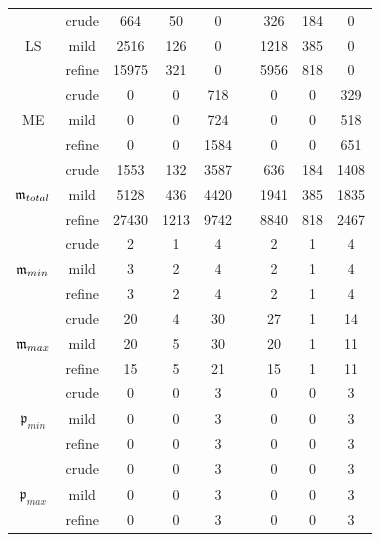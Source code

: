 \begin{table}[htb]
\begin{adjustbox}{width=0.8\columnwidth,center}
\begin{tabular}{  ccccccccc }
    \hline
    & crude & 664 & 50 & 0 &  & 326 & 184 & 0 \\
    LS & mild & 2516 & 126 & 0 &  & 1218 & 385 & 0 \\
    & refine & 15975 & 321 & 0 &  & 5956 & 818 & 0 \\
    \hline
    & crude & 0 & 0 & 718 &  & 0 & 0 & 329 \\
    ME & mild & 0 & 0 & 724 &  & 0 & 0 & 518 \\
    & refine & 0 & 0 & 1584 &  & 0 & 0 & 651 \\
    \hline
    & crude & 1553 & 132 & 3587 &  & 636 & 184 & 1408 \\
    $\mathfrak{m}_{total}$ & mild & 5128 & 436 & 4420 &  & 1941 & 385 & 1835 \\
    & refine & 27430 & 1213 & 9742 &  & 8840 & 818 & 2467 \\
    \hline
    & crude & 2 & 1 & 4 &  & 2 & 1 & 4 \\
    $\mathfrak{m}_{min}$ & mild & 3 & 2 & 4 &  & 2 & 1 & 4 \\
    & refine & 3 & 2 & 4 &  & 2 & 1 & 4 \\
    \hline
    & crude & 20 & 4 & 30 &  & 27 & 1 & 14 \\
    $\mathfrak{m}_{max}$ & mild & 20 & 5 & 30 &  & 20 & 1 & 11 \\
    & refine & 15 & 5 & 21 &  & 15 & 1 & 11 \\
    \hline
    & crude & 0 & 0 & 3 &  & 0 & 0 & 3 \\
    $\mathfrak{p}_{min}$ & mild & 0 & 0 & 3 &  & 0 & 0 & 3 \\
    & refine & 0 & 0 & 3 &  & 0 & 0 & 3 \\
    \hline
    & crude & 0 & 0 & 3 &  & 0 & 0 & 3 \\
    $\mathfrak{p}_{max}$ & mild & 0 & 0 & 3 &  & 0 & 0 & 3 \\
    & refine & 0 & 0 & 3 &  & 0 & 0 & 3 \\
    \hline
\end{tabular}
\end{adjustbox}
	\label{tab:num-exp-lldp-var-step:brussdnd}
\end{table}

\vspace{0.5cm}

